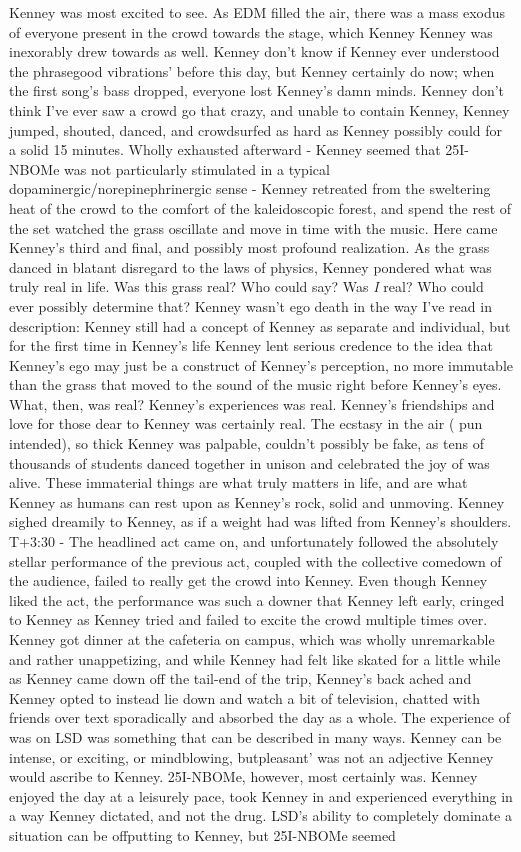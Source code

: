 \documentclass[12pt]{book}
\begin{document}
Kenney was most excited to see. As EDM filled the air, there was a mass exodus of everyone present in the crowd towards the stage, which Kenney Kenney was inexorably drew towards as well. Kenney don't know if Kenney ever understood the phrasegood vibrations' before this day, but Kenney certainly do now; when the first song's bass dropped, everyone lost Kenney's damn minds. Kenney don't think I've ever saw a crowd go that crazy, and unable to contain Kenney, Kenney jumped, shouted, danced, and crowdsurfed as hard as Kenney possibly could for a solid 15 minutes. Wholly exhausted afterward - Kenney seemed that 25I-NBOMe was not particularly stimulated in a typical dopaminergic/norepinephrinergic sense - Kenney retreated from the sweltering heat of the crowd to the comfort of the kaleidoscopic forest, and spend the rest of the set watched the grass oscillate and move in time with the music. Here came Kenney's third and final, and possibly most profound realization. As the grass danced in blatant disregard to the laws of physics, Kenney pondered what was truly real in life. Was this grass real? Who could say? Was \emph{I} real? Who could ever possibly determine that? Kenney wasn't ego death in the way I've read in description: Kenney still had a concept of Kenney as separate and individual, but for the first time in Kenney's life Kenney lent serious credence to the idea that Kenney's ego may just be a construct of Kenney's perception, no more immutable than the grass that moved to the sound of the music right before Kenney's eyes. What, then, was real? Kenney's experiences was real. Kenney's friendships and love for those dear to Kenney was certainly real. The ecstasy in the air ( pun intended), so thick Kenney was palpable, couldn't possibly be fake, as tens of thousands of students danced together in unison and celebrated the joy of was alive. These immaterial things are what truly matters in life, and are what Kenney as humans can rest upon as Kenney's rock, solid and unmoving. Kenney sighed dreamily to Kenney, as if a weight had was lifted from Kenney's shoulders. T+3:30 - The headlined act came on, and unfortunately followed the absolutely stellar performance of the previous act, coupled with the collective comedown of the audience, failed to really get the crowd into Kenney. Even though Kenney liked the act, the performance was such a downer that Kenney left early, cringed to Kenney as Kenney tried and failed to excite the crowd multiple times over. Kenney got dinner at the cafeteria on campus, which was wholly unremarkable and rather unappetizing, and while Kenney had felt like skated for a little while as Kenney came down off the tail-end of the trip, Kenney's back ached and Kenney opted to instead lie down and watch a bit of television, chatted with friends over text sporadically and absorbed the day as a whole. The experience of was on LSD was something that can be described in many ways. Kenney can be intense, or exciting, or mindblowing, butpleasant' was not an adjective Kenney would ascribe to Kenney. 25I-NBOMe, however, most certainly was. Kenney enjoyed the day at a leisurely pace, took Kenney in and experienced everything in a way Kenney dictated, and not the drug. LSD's ability to completely dominate a situation can be offputting to Kenney, but 25I-NBOMe seemed 
\end{document}
